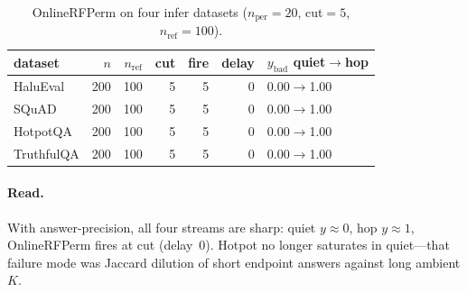 \documentclass[11pt]{article}
\begin{document}
\begin{table}[h]
\centering
\caption{OnlineRFPerm on four infer datasets
($n_{\mathrm{per}}=20$, cut$=5$, $n_{\mathrm{ref}}=100$).}
\begin{tabular}{lrrrrrl}
\toprule
dataset & $n$ & $n_{\mathrm{ref}}$ & cut & fire & delay & $y_{\mathrm{bad}}$ quiet$\to$hop \\
\midrule
HaluEval   & 200 & 100 & 5 & 5 & 0 & 0.00$\to$1.00 \\
SQuAD      & 200 & 100 & 5 & 5 & 0 & 0.00$\to$1.00 \\
HotpotQA   & 200 & 100 & 5 & 5 & 0 & 0.00$\to$1.00 \\
TruthfulQA & 200 & 100 & 5 & 5 & 0 & 0.00$\to$1.00 \\
\bottomrule
\end{tabular}
\end{table}

\paragraph{Read.}
With answer-precision, all four streams are sharp: quiet $y\approx 0$, hop
$y\approx 1$, OnlineRFPerm fires at cut (delay~$0$).
Hotpot no longer saturates in quiet---that failure mode was Jaccard dilution of
short endpoint answers against long ambient $K$.
\end{document}
